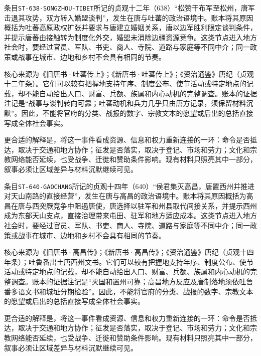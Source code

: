 
条目\texttt{ST-638-SONGZHOU-TIBET}所记的贞观十二年（638）“松赞干布军至松州，唐军击退其攻势，双方转入婚盟谈判”，发生在唐与吐蕃的政治语境中。账本将其原因概括为吐蕃高原政权扩张并要求与唐建立婚姻关系，唐以边军胜利限定谈判条件，并提示唐蕃由接触转为制度化外交，婚盟未消除边疆资源竞争。这类节点进入地方社会时，要经过官员、军队、书吏、商人、寺院、道路与家庭等不同中介；同一政策或战事在城市、边地和乡村不会具有相同的节奏。

核心来源为《旧唐书·吐蕃传上》；《新唐书·吐蕃传上》；《资治通鉴》唐纪（贞观十二年条）。它们可以较有把握地支持年序、制度公布、使节活动或特定地点的记载，却不能自动给出人口、财富、兵额、族属和内心动机的完整调查。账本的证据注记是“战事与谈判转向可靠；吐蕃动机和兵力几乎只由唐方记录，须保留材料沉默”。因此，不能将官府的分类、战报的数字、宗教文本的愿望或后出的总括直接写成全体社会事实。

更合适的解释是，将这一事件看成资源、信息和权力重新连接的一环：命令是否抵达，取决于交通和地方协作；征发是否落实，取决于登记、市场和劳力；文化和宗教网络能否延续，也受战争、迁徙和赞助条件影响。现有材料只照亮其中一部分，叙事必须让区域差异与材料沉默继续可见。


条目\texttt{ST-640-GAOCHANG}所记的贞观十四年（640）“侯君集灭高昌，唐置西州并推进对天山南路的直接经营”，发生在唐与高昌的政治语境中。账本将其原因概括为高昌在唐与西突厥竞争中阻遏唐使，唐选择以驻军和州县取代间接关系，并提示西州成为东部天山支点，直接治理带来屯田、驻军和地方适应成本。这类节点进入地方社会时，要经过官员、军队、书吏、商人、寺院、道路与家庭等不同中介；同一政策或战事在城市、边地和乡村不会具有相同的节奏。

核心来源为《旧唐书·高昌传》；《新唐书·高昌传》；《资治通鉴》唐纪（贞观十四年条）；吐鲁番出土唐西州文书。它们可以较有把握地支持年序、制度公布、使节活动或特定地点的记载，却不能自动给出人口、财富、兵额、族属和内心动机的完整调查。账本的证据注记是“灭国和置州可靠；高昌地方反应及唐制落地须依吐鲁番多语文书和城址分期检验”。因此，不能将官府的分类、战报的数字、宗教文本的愿望或后出的总括直接写成全体社会事实。

更合适的解释是，将这一事件看成资源、信息和权力重新连接的一环：命令是否抵达，取决于交通和地方协作；征发是否落实，取决于登记、市场和劳力；文化和宗教网络能否延续，也受战争、迁徙和赞助条件影响。现有材料只照亮其中一部分，叙事必须让区域差异与材料沉默继续可见。


